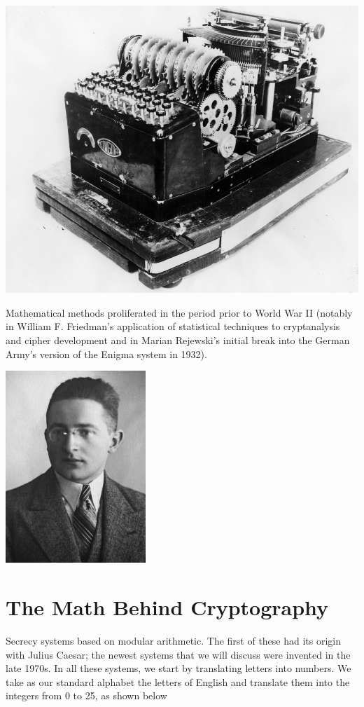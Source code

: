 \documentclass{report}
\theoremstyle{definition}
\begin{document}
{{{\begin{center}
\includegraphics[scale=0.3]{"enigma.png"}
\end{center}
Mathematical methods proliferated in the period prior to World War II (notably in William F. Friedman's application of statistical techniques to cryptanalysis and cipher development and in Marian Rejewski's initial break into the German Army's version of the Enigma system in 1932).}

\begin{center}
\includegraphics[scale=0.8]{"rajewski.png"}
\end{center}
\section{The Math Behind Cryptography}
\Large{Secrecy systems based on modular arithmetic. The first of these
had its origin with Julius Caesar; the newest systems that we will discuss were invented
in the late 1970s. In all these systems, we start by translating letters into numbers. We
take as our standard alphabet the letters of English and translate them into the integers
from 0 to 25, as shown below}
\begin{center}


\end{center}}}
\end{document}
